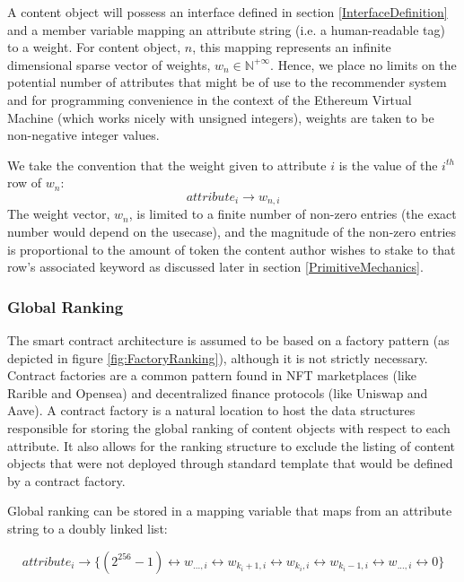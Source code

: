 A content object will possess an interface defined in section \ref{InterfaceDefinition} and a member variable mapping an attribute string (i.e. a human-readable tag) to a weight. For content object, $n$, this mapping represents an infinite dimensional sparse vector of weights, $w_n \in \mathbb{N}^{+\infty}$. Hence, we place no limits on the potential number of attributes that might be of use to the recommender system and for programming convenience in the context of the Ethereum Virtual Machine \cite{wood2014ethereum} (which works nicely with unsigned integers), weights are taken to be non-negative integer values. 

We take the convention that the weight given to  attribute $i$ is the value of the $i^{th}$ row of $w_n$: 
\begin{equation}
    \label{eq:weightVector}
    attribute_i \rightarrow w_{n,i}
\end{equation}
 The weight vector, $w_n$, is limited to a finite number of non-zero entries (the exact number would depend on the usecase), and the magnitude of the non-zero entries is proportional to the amount of token the content author wishes to stake to that row’s associated keyword as discussed later in section \ref{PrimitiveMechanics}. 

\subsubsection{Global Ranking}
\label{GlobalRankingDefinition}


The smart contract architecture is assumed to be based on a factory pattern (as depicted in figure \ref{fig:FactoryRanking}), although it is not strictly necessary. Contract factories are a common pattern found in NFT marketplaces (like Rarible and Opensea) and decentralized finance protocols (like Uniswap and Aave). A contract factory is a natural location to host the data structures responsible for storing the global ranking of content objects with respect to each attribute. It also allows for the ranking structure to exclude the listing of content objects that were not deployed through standard template that would be defined by a contract factory. 

Global ranking can be stored in a mapping variable that maps from an attribute string to a doubly linked list:

\begin{equation}
    attribute_i \rightarrow \{(2^{256}-1) \leftrightarrow w_{...,i} \leftrightarrow w_{k_i+1,i} \leftrightarrow w_{k_i,i} \leftrightarrow w_{k_i-1,i} \leftrightarrow w_{...,i} \leftrightarrow 0\}
\end{equation}

